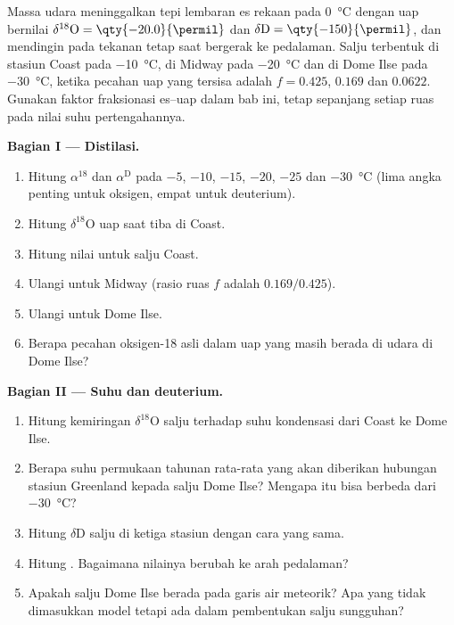 \begin{problem}\label{pb:b3:stable-isotopes:1}
Massa udara meninggalkan tepi lembaran es rekaan pada \qty{0}{\celsius}
dengan uap bernilai $\delta^{18}\mathrm O = \qty{-20.0}{\permil}$ dan $\delta\mathrm D =
\qty{-150}{\permil}$, dan mendingin pada tekanan tetap saat bergerak ke pedalaman.
Salju terbentuk di stasiun Coast pada \qty{-10}{\celsius}, di Midway pada
\qty{-20}{\celsius} dan di Dome Ilse pada \qty{-30}{\celsius}, ketika pecahan
uap yang tersisa adalah $f = 0.425$, $0.169$ dan $0.0622$. Gunakan faktor fraksionasi es--uap
dalam bab ini, tetap sepanjang setiap ruas pada nilai
suhu pertengahannya.

\medskip\noindent\textbf{Bagian I --- Distilasi.}
\begin{enumerate}
\item Hitung $\alpha^{18}$ dan $\alpha^{\mathrm D}$ pada $-5$, $-10$, $-15$, $-20$,
$-25$ dan \qty{-30}{\celsius} (lima angka penting untuk oksigen, empat untuk
deuterium).
\item Hitung $\delta^{18}\mathrm O$ uap saat tiba di Coast.
\item Hitung nilai untuk salju Coast.
\item Ulangi untuk Midway (rasio ruas $f$ adalah $0.169/0.425$).
\item Ulangi untuk Dome Ilse.
\item Berapa pecahan oksigen-18 asli dalam uap yang masih berada di udara
di Dome Ilse?
\end{enumerate}

\medskip\noindent\textbf{Bagian II --- Suhu dan deuterium.}
\begin{enumerate}[resume]
\item Hitung kemiringan $\delta^{18}\mathrm O$ salju terhadap
suhu kondensasi dari Coast ke Dome Ilse.
\item Berapa suhu permukaan tahunan rata-rata yang akan diberikan hubungan
stasiun Greenland kepada salju Dome Ilse? Mengapa itu bisa berbeda dari
\qty{-30}{\celsius}?
\item Hitung $\delta\mathrm D$ salju di ketiga stasiun dengan cara yang sama.
\item Hitung . Bagaimana nilainya berubah ke arah pedalaman?
\item Apakah salju Dome Ilse berada pada garis air meteorik? Apa yang
tidak dimasukkan model tetapi ada dalam pembentukan salju sungguhan?
\end{enumerate}


\end{problem}
